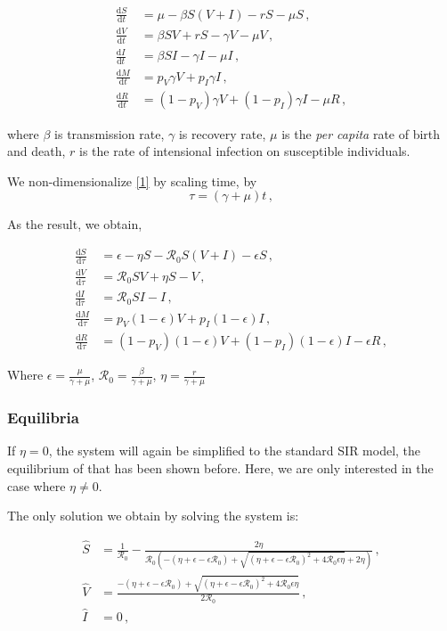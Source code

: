 \documentclass[12pt]{article}
\newcommand\dbyd[2]{\frac{\mathrm d{#1}}{\mathrm d{#2}}}
\newcommand{\R}{\mathcal{R}}
\newcommand{\pmV}{p_{V}}
\newcommand{\pmI}{p_{I}}
\begin{document}
\begin{subequations}\label{1}
\begin{align}
\dbyd{S}{t}&=\mu- \beta S(V+I)-rS-\mu S \,,\\
\dbyd{V}{t}&=\beta SV+rS-\gamma V -\mu V\,,\\
\dbyd{I}{t}&=\beta SI-\gamma I -\mu I\,,\\
\dbyd{M}{t}&=\pmV\gamma V+\pmI\gamma I\,,\\
\dbyd{R}{t}&=(1-\pmV)\gamma V+(1-\pmI)\gamma I-\mu R\,,
\end{align}
\end{subequations}

where $\beta$ is transmission rate, $\gamma$ is recovery rate, $\mu$ is the \emph{per capita} rate of birth and death, $r$ is the rate of intensional infection on susceptible individuals.

We non-dimensionalize \autoref{1} by scaling time, by
\begin{equation}
\tau=(\gamma+\mu)t \,,
\end{equation}

As the result, we obtain,

\begin{subequations}\label{eq:base}
\begin{align}
\dbyd{S}{\tau}&=\epsilon-\eta S-\R_0 S(V+I)-\epsilon S\,, \label{3a}\\
\dbyd{V}{\tau}&=\R_0 SV+\eta S-V\,, \label{3b}\\
\dbyd{I}{\tau}&=\R_0 SI-I\,, \label{3c}\\
\dbyd{M}{\tau}&=\pmV(1-\epsilon) V+\pmI(1-\epsilon) I\,,\\
\dbyd{R}{\tau}&=(1-\pmV)(1-\epsilon) V+(1-\pmI)(1-\epsilon) I-\epsilon R\,,
\end{align}
\end{subequations}

Where $\epsilon=\frac{\mu}{\gamma+\mu}$, $\R_0=\frac{\beta}{\gamma+\mu}$, $\eta=\frac{r}{\gamma+\mu}$

\subsubsection{Equilibria}
If $\eta=0$, the system will again be simplified to the standard SIR model, the equilibrium of that has been shown before. Here, we are only interested in the case where $\eta\neq0$.

The only solution we obtain by solving the system is:

\begin{subequations}\label{eq:EE}
\begin{align}
\hat{S} &= \frac{1}{\R_0}-\frac{2\eta}{\R_0(-(\eta+\epsilon-\epsilon\R_0)+\sqrt{(\eta+\epsilon-\epsilon\R_0)^2+4\R_0\epsilon \eta}+2\eta)}\,, \label{eq:Shat}\\
\hat{V} &= \frac{-(\eta+\epsilon-\epsilon\R_0)+\sqrt{(\eta+\epsilon-\epsilon\R_0)^2+4\R_0\epsilon \eta}}{2\R_0}\,, \label{eq:Vhat}\\
\hat{I} &= 0\,,
\end{align}
\end{subequations}
\end{document}
